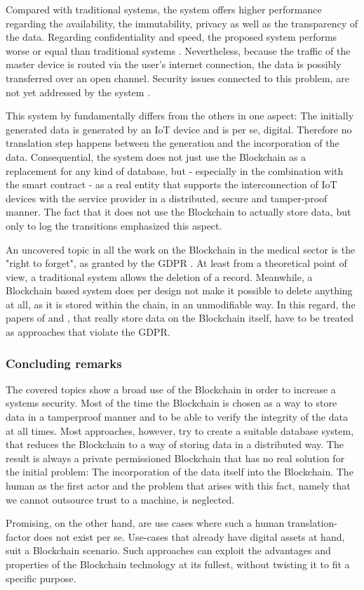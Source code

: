 Compared with traditional systems, the system offers higher performance regarding the availability, the immutability, privacy as well as the transparency of the data. Regarding confidentiality and speed, the proposed system performs worse or equal than traditional systems \cite{Baccarini2018}.
Nevertheless, because the traffic of the master device is routed via the user's internet connection, the data is possibly transferred over an open channel. Security issues connected to this problem, are not yet addressed by the system \cite{Baccarini2018}.

This system by \cite{Baccarini2018} fundamentally differs from the others in one aspect: The initially generated data is generated by an IoT device and is per se, digital. Therefore no translation step happens between the generation and the incorporation of the data.
Consequential, the system does not just use the Blockchain as a replacement for any kind of database, but - especially in the combination with the smart contract - as a real entity that supports the interconnection of IoT devices with the service provider in a distributed, secure and tamper-proof manner. The fact that it does not use the Blockchain to actually store data, but only to log the transitions emphasized this aspect.

An uncovered topic in all the work on the Blockchain in the medical sector is the "right to forget", as granted by the GDPR \cite{EuropeanCommission2017}. At least from a theoretical point of view, a traditional system allows the deletion of a record. Meanwhile, a Blockchain based system does per design not make it possible to delete anything at all, as it is stored within the chain, in an unmodifiable way. In this regard, the papers of \cite{Cao2019} and \cite{Azaria2016}, that really store data on the Blockchain itself, have to be treated as approaches that violate the GDPR.

\subsubsection{Concluding remarks}
The covered topics show a broad use of the Blockchain in order to increase a systems security. Most of the time the Blockchain is chosen as a way to store data in a tamperproof manner and to be able to verify the integrity of the data at all times.
Most approaches, however, try to create a suitable database system, that reduces the Blockchain to a way of storing data in a distributed way. The result is always a private permissioned Blockchain that has no real solution for the initial problem: The incorporation of the data itself into the Blockchain. The human as the first actor and the problem that arises with this fact, namely that we cannot outsource trust to a machine, is neglected.

Promising, on the other hand, are use cases where such a human translation-factor does not exist per se. Use-cases that already have digital assets at hand, suit a Blockchain scenario. Such approaches can exploit the advantages and properties of the Blockchain technology at its fullest, without twisting it to fit a specific purpose.
